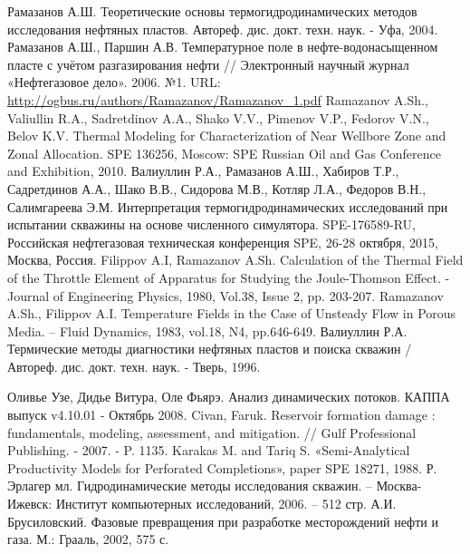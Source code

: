 \begin{thebibliography}{99}
 Рамазанов А.Ш. Теоретические основы термогидродинамических методов исследования нефтяных пластов. Автореф. дис. докт. техн. наук. - Уфа, 2004.
 Рамазанов А.Ш., Паршин А.В. Температурное поле в нефте-водонасыщенном пласте с учётом разгазирования нефти // Электронный научный журнал «Нефтегазовое дело». 2006. №1. URL: \url{http://ogbus.ru/authors/Ramazanov/Ramazanov_1.pdf}
 Ramazanov A.Sh., Valiullin R.A., Sadretdinov A.A., Shako V.V., Pimenov V.P., Fedorov V.N., Belov K.V. Thermal Modeling for Characterization of Near Wellbore Zone and Zonal Allocation. SPE 136256, Moscow: SPE Russian Oil and Gas Conference and Exhibition, 2010.
 Валиуллин Р.А., Рамазанов А.Ш., Хабиров Т.Р., Садретдинов А.А., Шако В.В., Сидорова М.В., Котляр Л.А., Федоров В.Н., Салимгареева Э.М. Интерпретация термогидродинамических  исследований при испытании скважины на основе численного симулятора. SPE-176589-RU, Российская нефтегазовая техническая конференция SPE, 26-28 октября, 2015, Москва, Россия.
 Filippov A.I, Ramazanov A.Sh. Calculation of the Thermal Field of the Throttle Element of Apparatus for Studying the Joule-Thomson Effect. - Journal of Engineering Physics, 1980, Vol.38, Issue 2, pp. 203-207.
 Ramazanov A.Sh., Filippov A.I. Temperature Fields in the Case of Unsteady Flow in Porous Media. – Fluid Dynamics, 1983,  vol.18, N4, pp.646-649. 
 Валиуллин Р.А. Термические методы диагностики нефтяных пластов и поиска скважин /   Автореф. дис. докт. техн. наук. - Тверь, 1996.

 Оливье Узе, Дидье Витура, Оле Фьярэ. Анализ динамических потоков. КАППА выпуск v4.10.01 - Октябрь 2008.
 Civan, Faruk. Reservoir formation damage : fundamentals, modeling, assessment, and mitigation. // Gulf Professional Publishing. - 2007. - P. 1135.
 Karakas M. and Tariq S. «Semi-Analytical Productivity Models for Perforated Completions», paper SPE 18271, 1988.
 Р. Эрлагер мл. Гидродинамические методы исследования скважин. -- Москва-Ижевск: Институт компьютерных исследований, 2006. -- 512 стр.
 А.И. Брусиловский. Фазовые превращения при разработке месторождений нефти и газа. М.: Грааль, 2002, 575 с.


\end{thebibliography}
